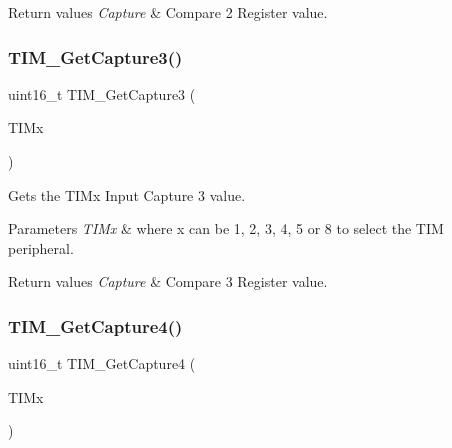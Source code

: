 \begin{DoxyRetVals}{Return values}
{\em Capture} & Compare 2 Register value. \\
\hline
\end{DoxyRetVals}
\mbox{\label{group___t_i_m___private___functions_gab71d1d3d8a15f3be9e74dca51fcca5fa}} 
\subsubsection{\texorpdfstring{TIM\_GetCapture3()}{TIM\_GetCapture3()}}
{\footnotesize\ttfamily uint16\+\_\+t T\+I\+M\+\_\+\+Get\+Capture3 (\begin{DoxyParamCaption}\item[{\mbox{\hyperlink{struct_t_i_m___type_def}{T\+I\+M\+\_\+\+Type\+Def}} $\ast$}]{T\+I\+Mx }\end{DoxyParamCaption})}



Gets the T\+I\+Mx Input Capture 3 value. 


\begin{DoxyParams}{Parameters}
{\em T\+I\+Mx} & where x can be 1, 2, 3, 4, 5 or 8 to select the T\+IM peripheral. \\
\hline
\end{DoxyParams}

\begin{DoxyRetVals}{Return values}
{\em Capture} & Compare 3 Register value. \\
\hline
\end{DoxyRetVals}
\mbox{\label{group___t_i_m___private___functions_ga09049af04c8345849c6f82ccfae242a6}} 
\subsubsection{\texorpdfstring{TIM\_GetCapture4()}{TIM\_GetCapture4()}}
{\footnotesize\ttfamily uint16\+\_\+t T\+I\+M\+\_\+\+Get\+Capture4 (\begin{DoxyParamCaption}\item[{\mbox{\hyperlink{struct_t_i_m___type_def}{T\+I\+M\+\_\+\+Type\+Def}} $\ast$}]{T\+I\+Mx }\end{DoxyParamCaption})}



